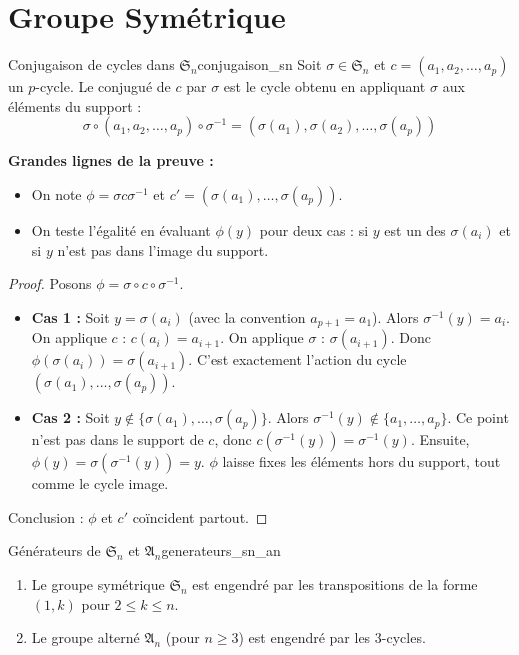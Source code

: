 \documentclass{prepacours}
\begin{document}
\section{Groupe Symétrique}

\begin{proposition}{Conjugaison de cycles dans $\mathfrak{S}_n$}{conjugaison_sn}
    Soit $\sigma \in \mathfrak{S}_n$ et $c = (a_1, a_2, \dots, a_p)$ un $p$-cycle.
    Le conjugué de $c$ par $\sigma$ est le cycle obtenu en appliquant $\sigma$ aux éléments du support :
    \[ \sigma \circ (a_1, a_2, \dots, a_p) \circ \sigma^{-1} = (\sigma(a_1), \sigma(a_2), \dots, \sigma(a_p)) \]
\end{proposition}

\noindent \textbf{Grandes lignes de la preuve :}
\begin{itemize}
    \item On note $\phi = \sigma c \sigma^{-1}$ et $c' = (\sigma(a_1), \dots, \sigma(a_p))$.
    \item On teste l'égalité en évaluant $\phi(y)$ pour deux cas : si $y$ est un des $\sigma(a_i)$ et si $y$ n'est pas dans l'image du support.
\end{itemize}

\begin{proof}
    Posons $\phi = \sigma \circ c \circ \sigma^{-1}$.
    \begin{itemize}
        \item \textbf{Cas 1 :} Soit $y = \sigma(a_i)$ (avec la convention $a_{p+1} = a_1$).
        Alors $\sigma^{-1}(y) = a_i$.
        On applique $c$ : $c(a_i) = a_{i+1}$.
        On applique $\sigma$ : $\sigma(a_{i+1})$.
        Donc $\phi(\sigma(a_i)) = \sigma(a_{i+1})$. C'est exactement l'action du cycle $(\sigma(a_1), \dots, \sigma(a_p))$.
        
        \item \textbf{Cas 2 :} Soit $y \notin \{\sigma(a_1), \dots, \sigma(a_p)\}$.
        Alors $\sigma^{-1}(y) \notin \{a_1, \dots, a_p\}$. Ce point n'est pas dans le support de $c$, donc $c(\sigma^{-1}(y)) = \sigma^{-1}(y)$.
        Ensuite, $\phi(y) = \sigma(\sigma^{-1}(y)) = y$.
        $\phi$ laisse fixes les éléments hors du support, tout comme le cycle image.
    \end{itemize}
    Conclusion : $\phi$ et $c'$ coïncident partout.
\end{proof}

\begin{proposition}{Générateurs de $\mathfrak{S}_n$ et $\mathfrak{A}_n$}{generateurs_sn_an}
    \begin{enumerate}
        \item Le groupe symétrique $\mathfrak{S}_n$ est engendré par les transpositions de la forme $(1, k)$ pour $2 \le k \le n$.
        \item Le groupe alterné $\mathfrak{A}_n$ (pour $n \ge 3$) est engendré par les 3-cycles.
    \end{enumerate}
\end{proposition}
\end{document}
